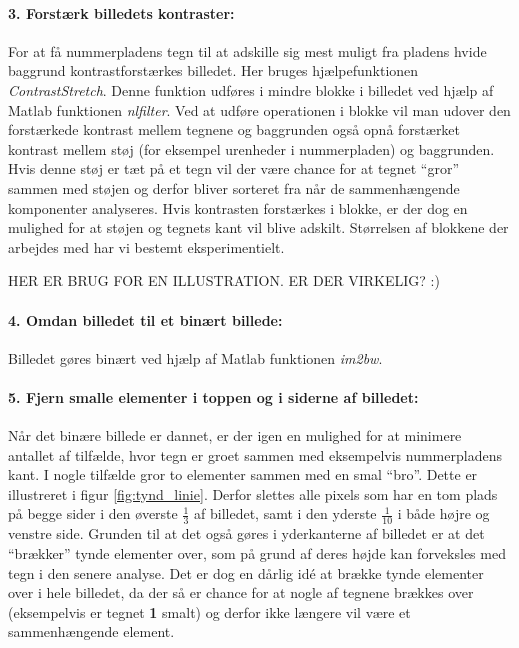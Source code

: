 \paragraph{3. Forstærk billedets kontraster:}
For at få nummerpladens tegn til at adskille sig mest muligt fra pladens hvide baggrund kontrastforstærkes billedet. Her bruges hjælpefunktionen \textit{ContrastStretch}. Denne funktion udføres i mindre blokke i billedet ved hjælp af Matlab funktionen \textit{nlfilter}. Ved at udføre operationen i blokke vil man udover den forstærkede kontrast mellem tegnene og baggrunden også opnå forstærket kontrast mellem støj (for eksempel urenheder i nummerpladen) og baggrunden. Hvis denne støj er tæt på et tegn vil der være chance for at tegnet ``gror'' sammen med støjen og derfor bliver sorteret fra når de sammenhængende komponenter analyseres. Hvis kontrasten forstærkes i blokke, er der dog en mulighed for at støjen og tegnets kant vil blive adskilt. Størrelsen af blokkene der arbejdes med har vi bestemt eksperimentielt.

HER ER BRUG FOR EN ILLUSTRATION. ER DER VIRKELIG? :)

\paragraph{4. Omdan billedet til et binært billede:} Billedet gøres binært ved hjælp af Matlab funktionen \textit{im2bw}.

\paragraph{5. Fjern smalle elementer i toppen og i siderne af billedet:}
Når det binære billede er dannet, er der igen en mulighed for at minimere antallet af tilfælde, hvor tegn er groet sammen med eksempelvis nummerpladens kant. I nogle tilfælde gror to elementer sammen med en smal ``bro''. Dette er illustreret i figur \vref{fig:tynd_linie}. Derfor slettes alle pixels som har en tom plads på begge sider i den øverste $\frac{1}{3}$ af billedet, samt i den yderste $\frac{1}{10}$ i både højre og venstre side. Grunden til at det også gøres i yderkanterne af billedet er at det ``brækker'' tynde elementer over, som på grund af deres højde kan forveksles med tegn i den senere analyse. Det er dog en dårlig idé at brække tynde elementer over i hele billedet, da der så er chance for at nogle af tegnene brækkes over (eksempelvis er tegnet \textbf{1} smalt) og derfor ikke længere vil være et sammenhængende element.

